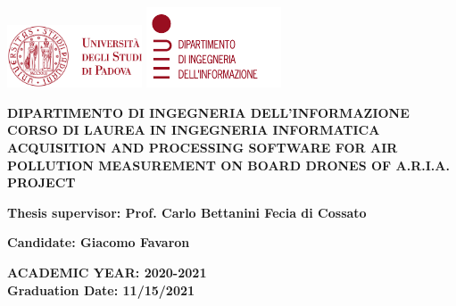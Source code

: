 \begin{titlepage}
  \begin{center}
    \includegraphics[width=0.3\textwidth]{images/unipd.png}
    \hfill
    \includegraphics[width=0.3\textwidth]{images/dei.png}
  \end{center}
  \begin{center}
    \vspace{3cm}
    \large
    \MakeUppercase{
      \textbf{
        Dipartimento di ingegneria dell'informazione\\
        \vspace{0.5cm}
        Corso di laurea in Ingegneria Informatica\\
      }
    }
    \vspace{4cm}
    \MakeUppercase{
      \textbf{
        Acquisition and processing software for air pollution measurement on board drones of A.R.I.A. project\\
      }
    }
    \vspace{4cm}
    \begin{flushleft}
      \textbf{
        Thesis supervisor: Prof. Carlo Bettanini Fecia di Cossato\\
      }
    \end{flushleft}
    \vspace{1cm}
    \begin{flushright}
      \textbf{
        Candidate: Giacomo Favaron\\
      }
    \end{flushright}
    \vspace{2.5cm}
    \MakeUppercase{
      \textbf{
        Academic Year: 2020-2021\\
      }
    }
    \vspace{0.5cm}
    \textbf{
      Graduation Date: 11/15/2021
    }
  \end{center}
\end{titlepage}
